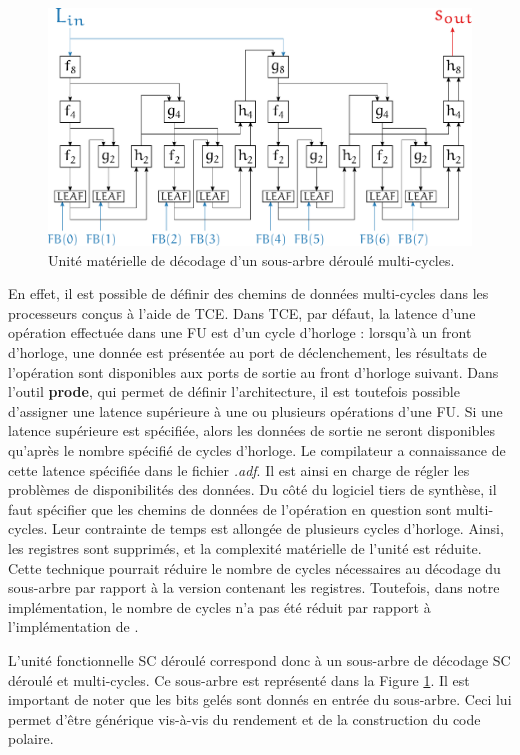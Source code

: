 \begin{figure}[htp]
	\centering
	\includegraphics[width=\textwidth]{main/ch4_fig/unrolled_multicycle}
	\caption{Unité matérielle de décodage d'un sous-arbre déroulé multi-cycles.}
	\label{fig:unrolled_multicycles}
\end{figure}

En effet, il est possible de définir des chemins de données multi-cycles dans les processeurs conçus à l'aide de TCE. Dans TCE, par défaut, la latence d'une opération effectuée dans une FU est d'un cycle d'horloge : lorsqu'à un front d'horloge, une donnée est présentée au port de déclenchement, les résultats de l'opération sont disponibles aux ports de sortie au front d'horloge suivant. Dans l'outil \textbf{prode}, qui permet de définir l'architecture, il est toutefois possible d'assigner une latence supérieure à une ou plusieurs opérations d'une FU. Si une latence supérieure est spécifiée, alors les données de sortie ne seront disponibles qu'après le nombre spécifié de cycles d'horloge. Le compilateur a connaissance de cette latence spécifiée dans le fichier \textit{.adf}. Il est ainsi en charge de régler les problèmes de disponibilités des données. Du côté du logiciel tiers de synthèse, il faut spécifier que les chemins de données de l'opération en question sont multi-cycles. Leur contrainte de temps est allongée de plusieurs cycles d'horloge. Ainsi, les registres sont supprimés, et la complexité matérielle de l'unité est réduite. Cette technique pourrait réduire le nombre de cycles nécessaires au décodage du sous-arbre par rapport à la version contenant les registres. Toutefois, dans notre implémentation, le nombre de cycles n'a pas été réduit par rapport à l'implémentation de \cite{gal_scalable_2016}. 

L'unité fonctionnelle \og SC déroulé \fg correspond donc à un sous-arbre de décodage SC déroulé et multi-cycles. Ce sous-arbre est représenté dans la Figure \ref{fig:unrolled_multicycles}. Il est important de noter que les bits gelés sont donnés en entrée du sous-arbre. Ceci lui permet d'être générique vis-à-vis du rendement et de la construction du code polaire.

